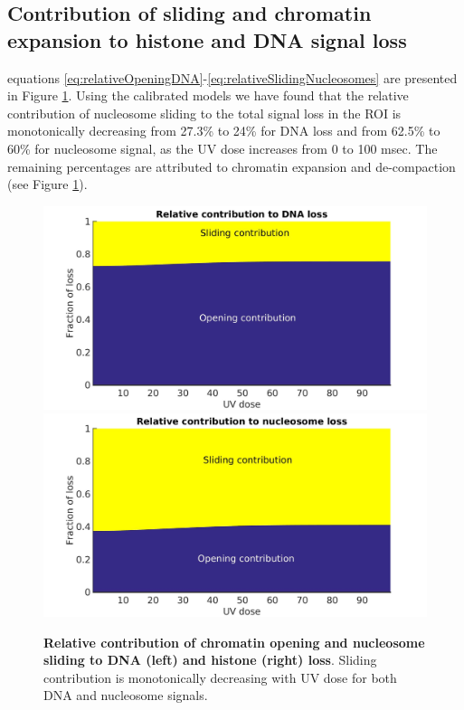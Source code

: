 \documentclass[12pt]{article}
\begin{document}
   \subsection{Contribution of sliding and chromatin expansion to histone and DNA signal loss}
   equations \eqref{eq:relativeOpeningDNA}-\eqref{eq:relativeSlidingNucleosomes} are presented in Figure \ref{fig:relatiiveContributionToLoss}.
   		Using the calibrated models we have found that the relative contribution
   		of nucleosome sliding to the total signal loss in the ROI is monotonically
   		decreasing from 27.3\% to 24\% for DNA loss and from 62.5\% to 60\% for nucleosome signal,
   		as the UV dose increases from 0 to 100 msec. The remaining percentages are
   		attributed to chromatin expansion and de-compaction (see Figure \ref{fig:relatiiveContributionToLoss}).
   		
   		\begin{figure}[H]
   			\includegraphics[width=0.5\linewidth, height=0.3\textheight]{relatiiveContributionToDNALoss}
   			\includegraphics[width=0.5\linewidth, height=0.3\textheight]{relativeContributionToHistoneLoss}
   			\caption{\textbf{Relative contribution of chromatin opening and nucleosome sliding to DNA (left) and histone (right) loss}. Sliding contribution is monotonically decreasing with UV dose for both DNA and nucleosome signals.}
   			\label{fig:relatiiveContributionToLoss}
   		\end{figure}	
	
	 
\end{document}
